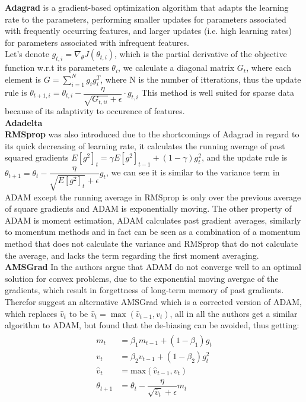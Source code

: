 \documentclass[10pt,a4paper]{article}
\begin{document}
\textbf{Adagrad} is a gradient-based optimization algorithm that adapts the learning rate to the parameters, performing smaller updates for parameters associated with frequently occurring features, and larger updates (i.e. high learning rates) for parameters associated with infrequent features.\\


Let's denote $g_{t, i} = \nabla_\theta J( \theta_{t, i} )$, which is the partial derivative of the objective function w.r.t its parameters $\theta_i$, we calculate a diagonal matrix $G_t$, where each element is $G=\sum_{i=1}^{N} g_i g_i^T$, where N is the number of itterations, thus the update rule is $\theta_{t+1, i} = \theta_{t, i} - \dfrac{\eta}{\sqrt{G_{t, ii}} + \epsilon} \cdot g_{t, i}$
This method is well suited for sparse data because of its adaptivity to occurence of features.
\\

\textbf{Adadelta} 
\\

\textbf{RMSprop} was also introduced due to the shortcomings of Adagrad in regard to its quick decreasing of learning rate, it calculates the running average of past squared gradients $E[g^2]_t = \gamma E[g^2]_{t-1} + (1 - \gamma) g^2_t$, and the update rule is $\theta_{t+1} = \theta_{t} - \dfrac{\eta}{\sqrt{E[g^2]_t} + \epsilon} g_{t}$, we can see it is similar to the variance term in ADAM except the running average in RMSprop is only over the previous average of square gradients and ADAM is exponentially moving.
The other property of ADAM is moment estimation, ADAM calculates past gradient averages, similarly to momentum methods and in fact can be seen as a combination of a momentum method that does not calculate the variance and RMSprop that do not calculate the average, and lacks the term regarding the first moment averaging.\\

\textbf{AMSGrad} In \cite{reddi2019convergence} the authors argue that ADAM do not converge well to an optimal solution for convex problems, due to the exponential moving avergae of the gradients, which result in forgettness of long-term memory of past gradients. Therefor suggest an alternative AMSGrad which is a corrected version of ADAM, which replaces $\hat{v}_t$ to be $\hat{v}_t = \max(\hat{v}_{t-1}, v_t)$, all in all the authors get a similar algorithm to ADAM, but found that the de-biasing can be avoided, thus getting:
\begin{align} 
    \begin{split} 
    m_t &= \beta_1 m_{t-1} + (1 - \beta_1) g_t \\ 
    v_t &= \beta_2 v_{t-1} + (1 - \beta_2) g_t^2\\ 
    \hat{v}_t &= \text{max}(\hat{v}_{t-1}, v_t) \\ 
    \theta_{t+1} &= \theta_{t} - \dfrac{\eta}{\sqrt{\hat{v}_t} + \epsilon} m_t 
    \end{split} 
\end{align}
    
\end{document}
